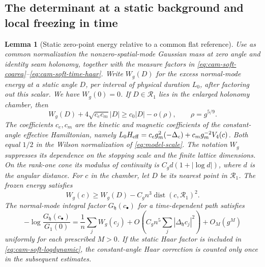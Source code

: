 \documentclass[11pt,a4paper]{article}
\newtheorem{lemma}[theorem]{Lemma}
\numberwithin{equation}{section}
\newcommand{\hper}{\mathfrak h}
\begin{document}
\subsection{The determinant at a static background and local freezing in time}

\begin{lemma}[Static zero-point energy relative to a common flat reference]\label{lem:cam-soft-hard}
Use as common normalization the nonzero-spatial-mode Gaussian mass at zero angle and identity seam holonomy, together with the measure factors in \eqref{eq:cam-soft-coarea}--\eqref{eq:cam-soft-time-haar}. Write \(W_g(D)\) for the excess normal-mode energy at a static angle \(D\), per interval of physical duration \(L_0\), after factoring out this scalar. We have \(W_g(0)=0\). If \(D\in\mathcal R_1\) lies in the enlarged holonomy chamber, then
\begin{equation}
 W_g(D)+4\sqrt{c_ec_m}|D|
   \ge c_0|D|-o(\rho),\qquad \rho=g^{5/9}.                        \label{eq:cam-soft-well}
\end{equation}
The coefficients \(c_e,c_m\) are the kinetic and magnetic coefficients of the constant-angle effective Hamiltonian, namely \(L_0H_{\rm eff}=c_e g_m^2(-\Delta_c)+c_m g_m^{-2}V_4(c)\). Both equal \(1/2\) in the Wilson normalization of \eqref{eq:model-scale}. The notation \(W_g\) suppresses its dependence on the stopping scale and the finite lattice dimensions. On the rank-one cone its modulus of continuity is \(C_gd(1+|\log d|)\), where \(d\) is the angular distance. For \(c\) in the chamber, let \(D\) be its nearest point in \(\mathcal R_1\). The frozen energy satisfies
\begin{equation}
 W_g(c)\ge W_g(D)-C_g n^3\operatorname{dist}(c,\mathcal R_1)^2 .
 \label{eq:cam-soft-rank1}
\end{equation}
The normal-mode integral factor \(G_\hper (c_\bullet)\) for a time-dependent path satisfies
\begin{equation}
 -\log\frac{G_\hper (c_\bullet)}{G_1(0)}
   =\frac1n\sum_j W_g(c_j)
       +O\!\left(C_g n^5\sum_j|\Delta_\hper c_j|^2\right)+O_M(g^M)
 \label{eq:cam-soft-logdynamic}
\end{equation}
uniformly for each prescribed \(M>0\). If the static Haar factor is included in \eqref{eq:cam-soft-logdynamic}, the constant-angle Haar correction is counted only once in the subsequent estimates.
\end{lemma}
\end{document}
